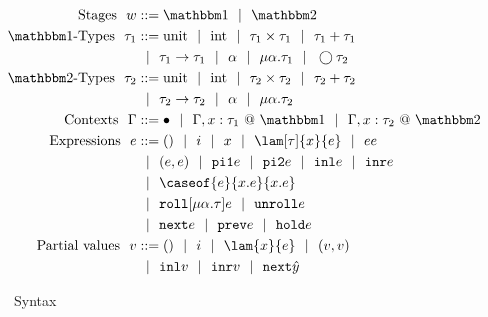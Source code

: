
\begin{figure}
\begin{abstrsyn}
\[\begin{aligned}
\text{Stages}\ \ 
\world &::= \bbone \gbar \bbtwo \\
%
\text{\bbone-Types}\ \ 
\type_1 &::= \text{unit}\gbar\text{int}%
 \gbar \type_1 \times \type_1
 \gbar \type_1 + \type_1 \\
&\gbar \type_1 \to \type_1
 \gbar \alpha \gbar \mu \alpha.\tau_1
 \gbar \fut \type_2 \\
%
\text{\bbtwo-Types}\ \ 
\type_2 &::= \text{unit}\gbar\text{int}%
 \gbar \type_2 \times \type_2
 \gbar \type_2 + \type_2 \\
&\gbar \type_2 \to \type_2
 \gbar \alpha \gbar \mu \alpha.\tau_2 \\
%
\text{Contexts}\ \ 
\context &::=\emptyC
 \gbar \context, x:\tau_1~@~\bbone
 \gbar \context, x:\tau_2~@~\bbtwo \\
%
\text{Expressions}\ \ 
\expr &::= ()\gbar\inte\gbar\var%
 \gbar \lam [\type] {\var}{\expr} 
 \gbar \expr \expr \\
&\gbar (\expr, \expr) 
 \gbar \pio \expr 
 \gbar \pit \expr
 \gbar \inl \expr 
 \gbar \inr \expr \\
&\gbar \caseof {\expr}{\var.\expr}{\var.\expr}
\\ %
&\gbar \roll [\mu \alpha.\tau] e
 \gbar \unroll e\\
&\gbar \next \expr 
 \gbar \prev \expr 
 \gbar \pause \expr \\
%
\text{Partial values}\ \ 
v &::= ()\gbar\inte%
 \gbar \lam{\var}{\expr} 
 \gbar (v,v) \\
&\gbar \inl v
 \gbar \inr v
 \gbar \next {\hat y} 
\end{aligned}\]
\end{abstrsyn}
\caption{\lang~Syntax}
\label{fig:grammar}
\end{figure}


